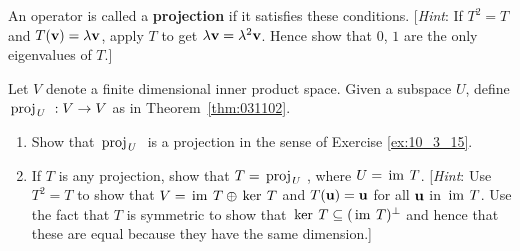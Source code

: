 \begin{multicols}{2}
\begin{ex}
\begin{enumerate}
An operator is called a \textbf{projection} if it satisfies these conditions. [\textit{Hint}: If $T^{2} = T$ and $T(\textbf{v}) = \lambda\textbf{v}$, apply $T$ to get $\lambda\textbf{v} = \lambda^{2}\textbf{v}$. Hence show that $0$, $1$ are the only eigenvalues of $T$.]

\end{enumerate}
\end{ex}

\begin{ex}
Let $V$ denote a finite dimensional inner product space. Given a subspace $U$, define \\ $\thinspace\operatorname{proj\medspace}_{\!U}\,{} : V \to V$ as in Theorem~\ref{thm:031102}.

\begin{enumerate}[label={\alph*.}]
\item Show that  $\thinspace\operatorname{proj\medspace}_{\!U}\,{}$ is a projection in the sense of Exercise \ref{ex:10_3_15}.

\item If $T$ is any projection, show that $T = \thinspace\operatorname{proj\medspace}_{\!U}\,{}$, where $U = \thinspace\operatorname{im\medspace} T$. [\textit{Hint}: Use $T^{2} = T$ to show that $V = \thinspace\operatorname{im\medspace} T \oplus \thinspace\operatorname{ker\medspace} T$ and $T(\textbf{u}) = \textbf{u}$ for all $\textbf{u}$ in $\thinspace\operatorname{im\medspace} T$. Use the fact that $T$ is symmetric to show that $\thinspace\operatorname{ker\medspace} T \subseteq (\thinspace\operatorname{im\medspace} T)^{\perp}$ and hence that these are equal because they have the same dimension.]

\end{enumerate}
\end{ex}
\end{multicols}
